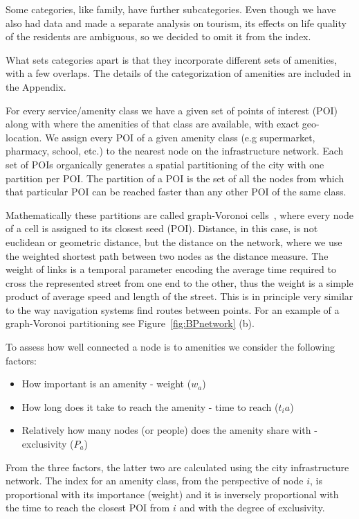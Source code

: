 Some categories, like family, have further subcategories. Even though we have also had data and made a separate analysis on tourism, its effects on life quality of the residents are ambiguous, so we decided to omit it from the index.

What sets categories apart is that they incorporate different sets of amenities, with a few overlaps. The details of the categorization of amenities are included in the Appendix.

For every service/amenity class we have a given set of points of interest (POI) along with where the amenities of that class are available, with exact geo-location. We assign every POI of a given amenity class (e.g supermarket, pharmacy, school, etc.) to the nearest node on the infrastructure network. Each set of POIs organically generates a spatial partitioning of the city with one partition per POI. The partition of a POI is the set of all the nodes from which that particular POI can be reached faster than any other POI of the same class.

Mathematically these partitions are called graph-Voronoi cells~\cite{Erwig2000Graph,Deritei2014Community}, where every node of a cell is assigned to its closest seed (POI). Distance, in this case, is not euclidean or geometric distance, but the distance on the network, where we use the weighted shortest path between two nodes as the distance measure. The weight of links is a temporal parameter encoding the average time required to cross the represented street from one end to the other, thus the weight is a simple product of average speed and length of the street. This is in principle very similar to the way navigation systems find routes between points. For an example of a graph-Voronoi partitioning see Figure~\ref{fig:BPnetwork} (b).

To assess how well connected a node is to amenities we consider the following factors:
\begin{itemize}
	\item How important is an amenity - weight ($w_a$)
	\item How long does it take to reach the amenity - time to reach ($t_ia$)
	\item Relatively how many nodes (or people) does the amenity share with - exclusivity ($P_a$)
\end{itemize}

From the three factors, the latter two are calculated using the city infrastructure network. The index for an amenity class, from the perspective of node $i$, is proportional with its importance (weight) and it is inversely proportional with the time to reach the closest POI from $i$ and with the degree of exclusivity.

